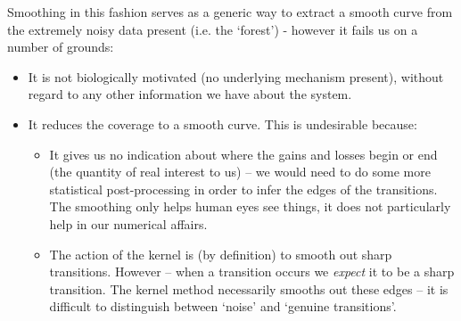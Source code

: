 \documentclass[fleqn,usenatbib]{mnras}
\begin{document}
			Smoothing in this fashion serves as a generic way to extract a smooth curve from the extremely noisy data present (i.e. the `forest') - however it fails us on a number of grounds:
			\begin{itemize}
				\item It is not biologically motivated (no underlying mechanism present), without regard to any other information we have about the system.
				\item It reduces the coverage to a smooth curve. This is undesirable because:
				\begin{itemize}
					\item It gives us no indication about where the gains and losses begin or end (the quantity of real interest to us) -- we would need to do some more statistical post-processing in order to infer the edges of the transitions. The smoothing only helps human eyes see things, it does not particularly help in our numerical affairs.
					\item The action of the kernel is (by definition) to smooth out sharp transitions. However -- when a transition occurs we \textit{expect} it to be a sharp transition. The kernel method necessarily smooths out these edges -- it is difficult to distinguish between `noise' and `genuine transitions'.
				\end{itemize}
			\end{itemize}


			
\end{document}
